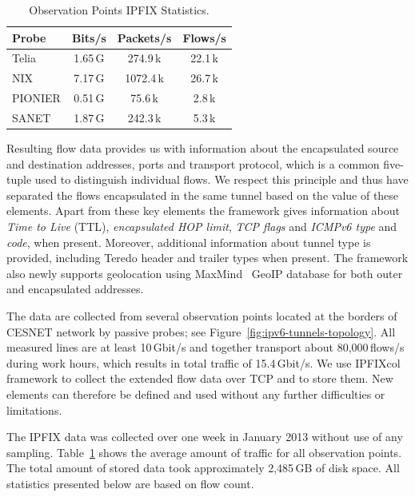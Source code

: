 \begin{table}[!tb]
\centering
        \begin{tabular}{lccc}
        \textbf{Probe} & \textbf{Bits/s} & \textbf{Packets/s} & \textbf{Flows/s} \\ \toprule 
        Telia & 1.65\,G & 274.9\,k & 22.1\,k \\
        NIX & 7.17\,G & 1072.4\,k & 26.7\,k \\
        PIONIER & 0.51\,G & 75.6\,k & 2.8\,k \\
        SANET & 1.87\,G & 242.3\,k & 5.3\,k \\ \bottomrule
        \end{tabular}
        \caption{Observation Points IPFIX Statistics.}
        \label{tab:ipv6-tunnels-collected-data}
\end{table}

Resulting flow data provides us with information about the encapsulated source and destination addresses, ports and transport protocol, which is a common five-tuple used to distinguish individual flows. We respect this principle and thus have separated the flows encapsulated in the same tunnel based on the value of these elements. Apart from these key elements the framework gives information about \emph{Time to Live} (TTL), \emph{encapsulated HOP limit}, \emph{TCP flags} and \emph{ICMPv6 type} and \emph{code}, when present. Moreover, additional information about tunnel type is provided, including Teredo header and trailer types when present. The framework also newly supports geolocation using MaxMind~\cite{MaxMind-2013-MaxMind} GeoIP database for both outer and encapsulated addresses.

The data are collected from several observation points located at the borders of CESNET network by passive probes; see Figure~\ref{fig:ipv6-tunnels-topology}. All measured lines are at least 10\,Gbit/s and together transport about 80,000\,flows/s during work hours, which results in total traffic of 15.4\,Gbit/s. We use IPFIXcol~\cite{Velan-2012-Flow} framework to collect the extended flow data over TCP and to store them. New elements can therefore be defined and used without any further difficulties or limitations.

The IPFIX data was collected over one week in January 2013 without use of any sampling. Table~\ref{tab:ipv6-tunnels-collected-data} shows the average amount of traffic for all observation points. The total amount of stored data took approximately 2,485\,GB of disk space. All statistics presented below are based on flow count.


